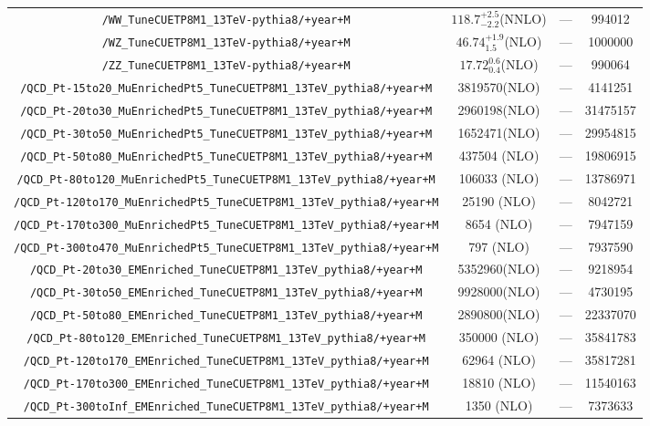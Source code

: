\begin{adjustbox}{max width=\textwidth}
\begin{tabular}{cccc}
    \verb|/WW_TuneCUETP8M1_13TeV-pythia8/+year+M|  
    &$118.7^{+2.5}_{-2.2}$(NNLO) & ---   & 994012  \\[0.1cm] 
    \verb|/WZ_TuneCUETP8M1_13TeV-pythia8/+year+M|  
    &$46.74^{+1.9}_{1.5}$(NLO)  & ---  & 1000000 \\[0.1cm] 
    \verb|/ZZ_TuneCUETP8M1_13TeV-pythia8/+year+M|  
    &$17.72^{0.6}_{0.4}$(NLO)  & ---  & 990064  \\[0.1cm] \hline
 \verb|/QCD_Pt-15to20_MuEnrichedPt5_TuneCUETP8M1_13TeV_pythia8/+year+M|    & 3819570(NLO) & ---  & 4141251   \\[0.1cm]
 \verb|/QCD_Pt-20to30_MuEnrichedPt5_TuneCUETP8M1_13TeV_pythia8/+year+M|    & 2960198(NLO) & ---  & 31475157  \\[0.1cm]
 \verb|/QCD_Pt-30to50_MuEnrichedPt5_TuneCUETP8M1_13TeV_pythia8/+year+M|    & 1652471(NLO) & ---  & 29954815  \\[0.1cm]
 \verb|/QCD_Pt-50to80_MuEnrichedPt5_TuneCUETP8M1_13TeV_pythia8/+year+M|    & 437504 (NLO) & ---  & 19806915  \\[0.1cm]
 \verb|/QCD_Pt-80to120_MuEnrichedPt5_TuneCUETP8M1_13TeV_pythia8/+year+M|   & 106033 (NLO) & ---  & 13786971  \\[0.1cm]
 \verb|/QCD_Pt-120to170_MuEnrichedPt5_TuneCUETP8M1_13TeV_pythia8/+year+M|  & 25190  (NLO) & ---  & 8042721   \\[0.1cm]
 \verb|/QCD_Pt-170to300_MuEnrichedPt5_TuneCUETP8M1_13TeV_pythia8/+year+M|  & 8654   (NLO) & ---  & 7947159   \\[0.1cm]
 \verb|/QCD_Pt-300to470_MuEnrichedPt5_TuneCUETP8M1_13TeV_pythia8/+year+M|  & 797    (NLO) & ---  & 7937590   \\[0.1cm]\hline

 \verb|/QCD_Pt-20to30_EMEnriched_TuneCUETP8M1_13TeV_pythia8/+year+M|      & 5352960(NLO) & ---  & 9218954    \\[0.1cm]
 \verb|/QCD_Pt-30to50_EMEnriched_TuneCUETP8M1_13TeV_pythia8/+year+M|      & 9928000(NLO) & ---  & 4730195    \\[0.1cm]
 \verb|/QCD_Pt-50to80_EMEnriched_TuneCUETP8M1_13TeV_pythia8/+year+M|      & 2890800(NLO) & ---  & 22337070   \\[0.1cm]
 \verb|/QCD_Pt-80to120_EMEnriched_TuneCUETP8M1_13TeV_pythia8/+year+M|     & 350000 (NLO) & ---  & 35841783   \\[0.1cm]
 \verb|/QCD_Pt-120to170_EMEnriched_TuneCUETP8M1_13TeV_pythia8/+year+M|    & 62964  (NLO) & ---  & 35817281   \\[0.1cm]
 \verb|/QCD_Pt-170to300_EMEnriched_TuneCUETP8M1_13TeV_pythia8/+year+M|    & 18810  (NLO) & ---  & 11540163   \\[0.1cm]
 \verb|/QCD_Pt-300toInf_EMEnriched_TuneCUETP8M1_13TeV_pythia8/+year+M|    & 1350   (NLO) & ---  & 7373633    \\[0.1cm]\hline


\end{tabular}
\end{adjustbox}
